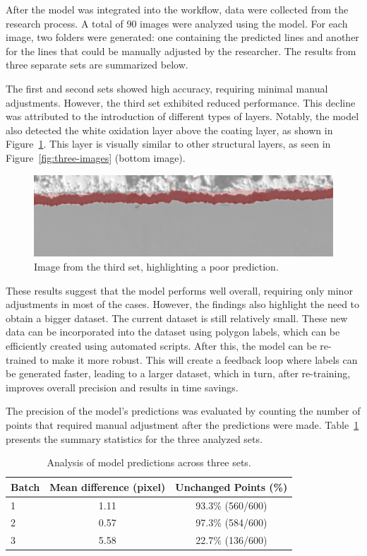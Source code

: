 After the model was integrated into the workflow, data were collected from the research process. A total of 90 images were analyzed using the model. For each image, two folders were generated: one containing the predicted lines and another for the lines that could be manually adjusted by the researcher. The results from three separate sets are summarized below.

The first and second sets showed high accuracy, requiring minimal manual adjustments. However, the third set exhibited reduced performance. This decline was attributed to the introduction of different types of layers. Notably, the model also detected the white oxidation layer above the coating layer, as shown in Figure~\ref{fig:ox}. This layer is visually similar to other structural layers, as seen in Figure~\ref{fig:three-images} (bottom image).

\begin{figure}[H]
    \centering
    \includegraphics[width=0.8\linewidth]{PICTURES/wrongPred.png}
    \caption{Image from the third set, highlighting a poor prediction.}
    \label{fig:ox}
\end{figure}

These results suggest that the model performs well overall, requiring only minor adjustments in most of the cases. However, the findings also highlight the need to obtain a bigger dataset. The current dataset is still relatively small. These new data can be incorporated into the dataset using polygon labels, which can be efficiently created using automated scripts. After this, the model can be re-trained to make it more robust. This will create a feedback loop where labels can be generated faster, leading to a larger dataset, which in turn, after re-training, improves overall precision and results in time savings.

The precision of the model's predictions was evaluated by counting the number of points that required manual adjustment after the predictions were made. Table~\ref{tab:results} presents the summary statistics for the three analyzed sets.

\begin{table}[H]
    \centering
    \caption{Analysis of model predictions across three sets.}

    \begin{tabular}{lcc}
        \toprule
        \textbf{Batch} & \textbf{Mean difference (pixel)}  & \textbf{Unchanged Points (\%)} \\
        \midrule
        1 & 1.11  & 93.3\% (560/600) \\
        2 & 0.57  & 97.3\% (584/600) \\
        3 & 5.58  & 22.7\% (136/600) \\
        \bottomrule
    \end{tabular}
    \label{tab:results}

\end{table}

